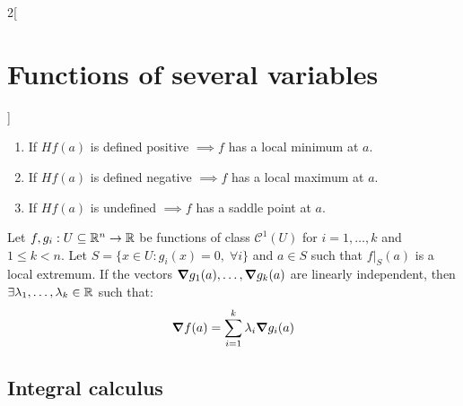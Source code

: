 \documentclass[../../../main.tex]{subfiles}
\begin{document}
\begin{multicols}{2}[\section{Functions of several variables}]
\begin{theorem}
    \begin{enumerate}
      \item If $Hf(a)$ is defined positive $\implies f$ has a local minimum at $a$.
      \item If $Hf(a)$ is defined negative $\implies f$ has a local maximum at $a$.
      \item If $Hf(a)$ is undefined $\implies f$ has a saddle point at $a$.
    \end{enumerate}
  \end{theorem}
  \begin{theorem}
    Let $f,g_i:U\subseteq\mathbb{R}^n\rightarrow\mathbb{R} $ be functions of class $\mathcal{C}^1(U)$ for $i=1,\ldots,k$ and $1\leq k<n$. Let $S=\{x\in U:g_i(x)=0,\;\forall i\}$ and $a\in S$ such that $f|_S(a)$ is a local extremum. If the vectors $\grad g_1(a),\ldots,\grad g_k(a)$ are linearly independent, then $\exists\lambda_1,\ldots,\lambda_k\in\mathbb{R} $ such that: $$\grad f(a)=\sum_{i=1}^k\lambda_i\grad g_i(a)$$
  \end{theorem}
  \subsection{Integral calculus}

\end{multicols}
\end{document}

